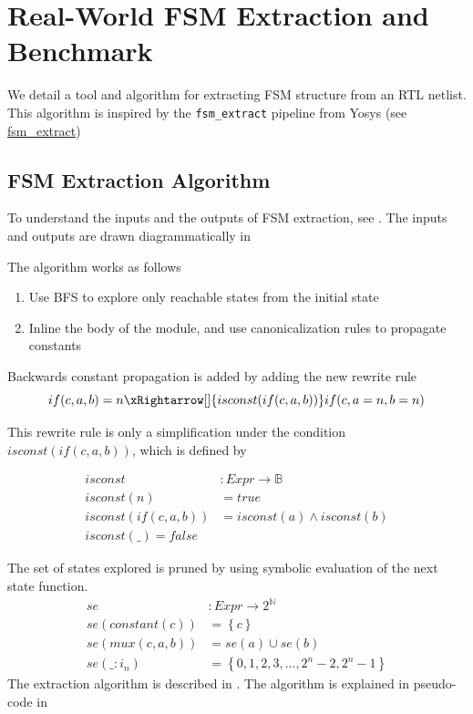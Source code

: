 \documentclass[acmsmall,screen,review]{acmart}
\begin{document}
\section{Real-World FSM Extraction and Benchmark}
\label{sec:fsm-extraction}

We detail a tool and algorithm for extracting FSM structure from an RTL netlist.
This algorithm is inspired by the \texttt{fsm\_extract} pipeline from Yosys (see \href{https://yosyshq.readthedocs.io/projects/yosys/en/0.44/cmd/fsm_extract.html}{fsm\_extract})


\subsection{FSM Extraction Algorithm}
To understand the inputs and the outputs of FSM extraction, see .
The inputs and outputs are drawn diagrammatically in 

The algorithm works as follows
\begin{enumerate}
  \item Use BFS to explore only reachable states from the initial state
  \item Inline the body of the module, and use canonicalization rules to propagate constants
\end{enumerate}

Backwards constant propagation is added by adding the new rewrite rule
\[if(c,a,b) = n  \xRightarrow[]{isconst(if(c,a,b))}if(c, a = n, b = n)\]

This rewrite rule is only a simplification under the condition $isconst(if(c,a,b))$, which is defined by

\begin{align}
isconst &: Expr \to \mathbb{B}\\
isconst(n) &= true \\
isconst(if(c, a, b)) &= isconst(a) \land isconst (b) \\
isconst(\_) = false
\end{align}

The set of states explored is pruned by using symbolic evaluation of the next state function.
\begin{align}
se &: Expr \to 2^{\mathbb{N}} \\
se(constant(c)) &= \left\{c\right\} \\
se(mux(c,a,b)) &= se(a) \cup se(b) \\
se(\_ : i_{n}) &= \left\{0, 1, 2, 3, \ldots, 2^{n}-2, 2^{n}-1\right\}
\end{align}
The extraction algorithm is described in .
The algorithm is explained in pseudo-code in 
\end{document}
